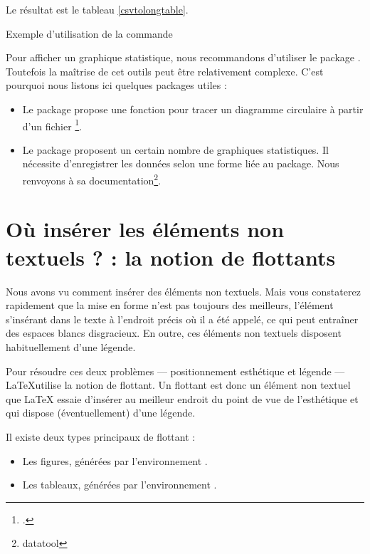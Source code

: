 Le résultat est le tableau \ref{csvtolongtable}.

\begin{table}[h]
\setcsvseparator{;}

\caption{Exemple d'utilisation de la commande }
\label{csvtolongtable}
\end{table}


\begin{plusloins}
Pour afficher un graphique statistique, nous recommandons d'utiliser le package . Toutefois la maîtrise de cet outils peut être relativement complexe. C'est pourquoi nous listons ici quelques packages utiles : 
\begin{itemize}
\item Le package  propose une fonction pour tracer un diagramme circulaire à partir d'un fichier \footcite[Sa documentation se trouve dans celle du package  :][]{csvtools_pie}. 
\item Le package  proposent un certain nombre de graphiques statistiques. Il nécessite d'enregistrer les données selon une forme liée au package. Nous renvoyons à sa documentation\footnote{datatool}.
\end{itemize}
\end{plusloins}


\section[La notion de flottants]{Où insérer les éléments non textuels ? : la notion de flottants}
\label{legende}
Nous avons vu comment insérer des éléments non textuels. Mais vous constaterez rapidement que la mise en forme n'est pas toujours des meilleurs, l'élément s'insérant dans le texte à l'endroit précis où il a été appelé, ce qui peut entraîner des espaces blancs disgracieux.
En outre, ces éléments non textuels disposent habituellement d'une légende.

Pour résoudre ces deux problèmes --- positionnement esthétique et légende --- \LaTeX utilise la notion de flottant. Un flottant est donc un élément non textuel que LaTeX essaie d'insérer au meilleur endroit du point de vue de l'esthétique et qui dispose (éventuellement) d'une légende.

Il existe deux types principaux de flottant :
\begin{itemize}
	\item Les figures, générées par l'environnement .
	\item Les tableaux, générées par l'environnement .
\end{itemize}

